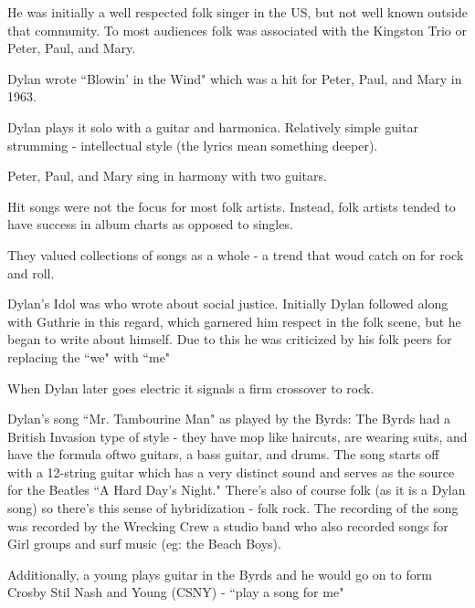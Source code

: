 \documentclass[12pt, a4paper, twoside, openright, titlepage]{book}
\begin{document}
He was initially a well respected folk singer in the US, but not well known outside that community. To most audiences folk was associated with the Kingston Trio or Peter, Paul, and Mary.

\begin{note}{}{}
    Dylan wrote ``Blowin' in the Wind" which was a hit for Peter, Paul, and Mary in 1963.
\end{note}

\begin{eg}{}{}
    Dylan plays it solo with a guitar and harmonica. Relatively simple guitar strumming - intellectual style (the lyrics mean something deeper).

    Peter, Paul, and Mary sing in harmony with two guitars.
\end{eg}


\begin{rmk}{}{}
    Hit songs were not the focus for most folk artists. Instead, folk artists tended to have success in album charts as opposed to singles.


    They valued collections of songs as a whole - a trend that woud catch on for rock and roll.
\end{rmk}

\begin{rmk}{}{}
    Dylan's Idol was  who wrote about social justice. Initially Dylan followed along with Guthrie in this regard, which garnered him respect in the folk scene, but he began to write about himself. Due to this he was criticized by his folk peers for replacing the ``we" with ``me"
\end{rmk}

When Dylan later goes electric it signals a firm crossover to rock.

\begin{eg}{}{}
    Dylan's song ``Mr. Tambourine Man" as played by the Byrds: The Byrds had a British Invasion type of style - they have mop like haircuts, are wearing suits, and have the formula oftwo guitars, a bass guitar, and drums. The song starts off with a 12-string guitar which has a very distinct sound and serves as the source for the Beatles ``A Hard Day's Night." There's also of course folk (as it is a Dylan song) so there's this sense of hybridization - folk rock. The recording of the song was recorded by the Wrecking Crew a studio band who also recorded songs for Girl groups and surf music (eg: the Beach Boys).

    Additionally, a young  plays guitar in the Byrds and he would go on to form Crosby Stil Nash and Young (CSNY) - ``play a song for me"
\end{eg}
\end{document}
